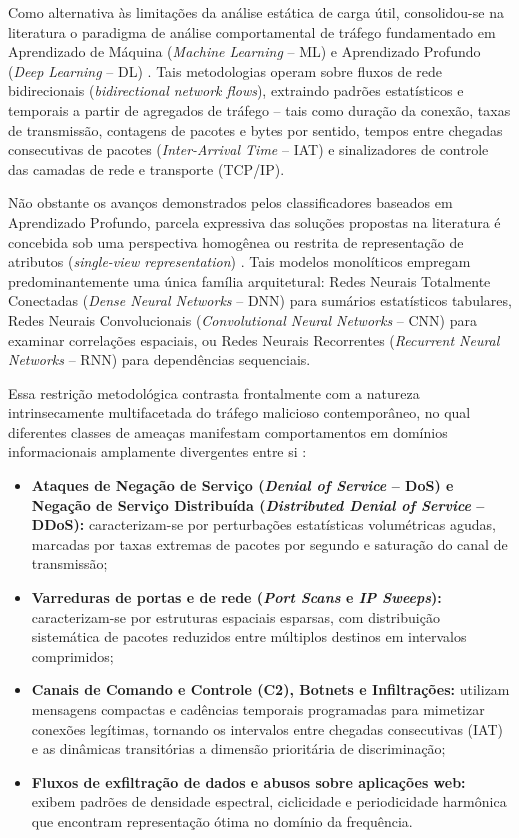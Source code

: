 Como alternativa às limitações da análise estática de carga útil, consolidou-se na literatura o paradigma de análise comportamental de tráfego fundamentado em Aprendizado de Máquina (\emph{Machine Learning} -- ML) e Aprendizado Profundo (\emph{Deep Learning} -- DL) \cite{survey2025dl, neuralcyber2025}. Tais metodologias operam sobre fluxos de rede bidirecionais (\emph{bidirectional network flows}), extraindo padrões estatísticos e temporais a partir de agregados de tráfego -- tais como duração da conexão, taxas de transmissão, contagens de pacotes e bytes por sentido, tempos entre chegadas consecutivas de pacotes (\emph{Inter-Arrival Time} -- IAT) e sinalizadores de controle das camadas de rede e transporte (TCP/IP).

Não obstante os avanços demonstrados pelos classificadores baseados em Aprendizado Profundo, parcela expressiva das soluções propostas na literatura é concebida sob uma perspectiva homogênea ou restrita de representação de atributos (\emph{single-view representation}) \cite{timematters2025, temporal2025}. Tais modelos monolíticos empregam predominantemente uma única família arquitetural: Redes Neurais Totalmente Conectadas (\emph{Dense Neural Networks} -- DNN) para sumários estatísticos tabulares, Redes Neurais Convolucionais (\emph{Convolutional Neural Networks} -- CNN) para examinar correlações espaciais, ou Redes Neurais Recorrentes (\emph{Recurrent Neural Networks} -- RNN) para dependências sequenciais.

Essa restrição metodológica contrasta frontalmente com a natureza intrinsecamente multifacetada do tráfego malicioso contemporâneo, no qual diferentes classes de ameaças manifestam comportamentos em domínios informacionais amplamente divergentes entre si \cite{ciciot2023, ugr162021}:
\begin{itemize}
    \item \textbf{Ataques de Negação de Serviço (\emph{Denial of Service} -- DoS) e Negação de Serviço Distribuída (\emph{Distributed Denial of Service} -- DDoS):} caracterizam-se por perturbações estatísticas volumétricas agudas, marcadas por taxas extremas de pacotes por segundo e saturação do canal de transmissão;
    \item \textbf{Varreduras de portas e de rede (\emph{Port Scans} e \emph{IP Sweeps}):} caracterizam-se por estruturas espaciais esparsas, com distribuição sistemática de pacotes reduzidos entre múltiplos destinos em intervalos comprimidos;
    \item \textbf{Canais de Comando e Controle (C2), Botnets e Infiltrações:} utilizam mensagens compactas e cadências temporais programadas para mimetizar conexões legítimas, tornando os intervalos entre chegadas consecutivas (IAT) e as dinâmicas transitórias a dimensão prioritária de discriminação;
    \item \textbf{Fluxos de exfiltração de dados e abusos sobre aplicações web:} exibem padrões de densidade espectral, ciclicidade e periodicidade harmônica que encontram representação ótima no domínio da frequência.
\end{itemize}

